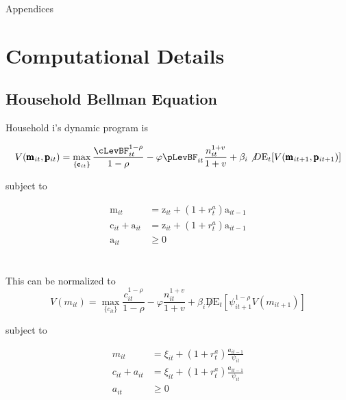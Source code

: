 \documentclass[titlepage]{\econtex}\providecommand{\texname}{BufferStockTheory}
\begin{document}
\clearpage\vfill\eject

\appendix

\centerline{\LARGE Appendices}\vspace{0.2in}




\hypertarget{Computational Details}{}
\section{Computational Details}

\hypertarget{Household Bellman Equation }{}
\subsection{Household Bellman Equation}

Household i's dynamic program is

$$ V(\pmb{\mathrm{m}}_{it},\pmb{\mathrm{p}}_{it})=\max_{ \{ \pmb{\mathrm{c}}_{it}\}} { \frac{\cLevBF_{i t}^{1-\rho}}{1 -\rho} - \varphi \pLevBF_{it} \frac{n_{it}^{1+v}}{1+v} + \beta_{i} \not D \mathrm{E}_{t}[V( \pmb{\mathrm{m}}_{it+1} , \pmb{\mathrm{p}}_{it+1})]}$$

subject to 

\begin{align*}
 \pmb{\mathrm{m}}_{i t} & = \pmb{\mathrm{z}}_{i t}  + (1+\mathit{r}^{a}_{t})\pmb{\mathrm{a}}_{i t-1} \\
 \pmb{\mathrm{c}}_{i t}  + \pmb{\mathrm{a}}_{i t} &= \pmb{\mathrm{z}}_{i t}  + (1+\mathit{r}^{a}_{t}) \pmb{\mathrm{a}}_{i t-1}   \\
\pmb{\mathrm{a}}_{it} &\geq 0 
\end{align*} \\ \\

This can be normalized to \\


$$ V(m_{it}) = \max_{\{c_{it}\}} {  \frac{c_{i t}^{1-\rho}}{1 -\rho} - \varphi \frac{n_{it}^{1+v}}{1+v} + \beta_{i}\not D \mathrm{E}_{t}[\psi_{it+1}^{1-\rho} V(m_{it+1})]}$$

 subject to 
 
 \begin{align*}
m_{i t} &=  \xi_{it}  + (1+r^{a}_{t}) \frac{a_{i t-1}}{\psi_{it}} \\
 c_{i t}  + a_{i t} &= \xi_{it}  + (1+r^{a}_{t}) \frac{a_{i t-1}}{\psi_{it}} \\
 a_{it} &\geq 0 
 \end{align*}
 
\end{document}
